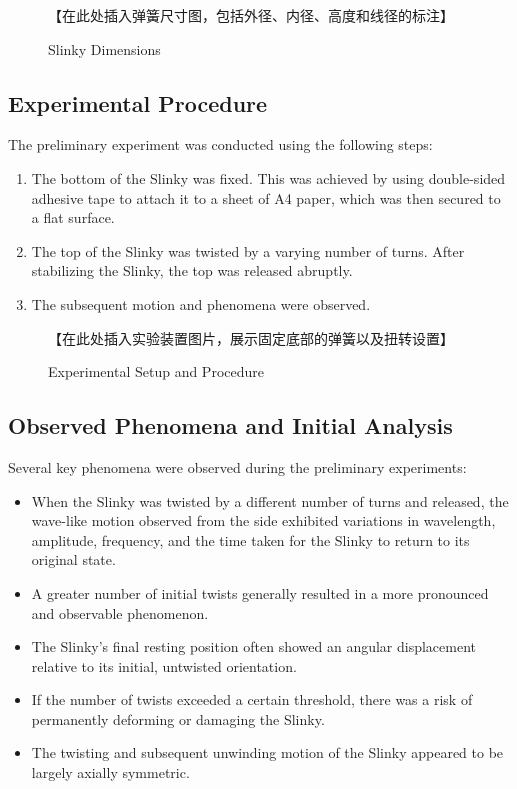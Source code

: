 \documentclass{mcmthesis}  %
\begin{document}
\begin{figure}[h!]
    \centering
    【在此处插入弹簧尺寸图，包括外径、内径、高度和线径的标注】
    \caption{Slinky Dimensions}
    \label{fig:slinky_dimensions}
\end{figure}

\subsection{Experimental Procedure} %
The preliminary experiment was conducted using the following steps:
\begin{enumerate}
    \item The bottom of the Slinky was fixed. This was achieved by using double-sided adhesive tape to attach it to a sheet of A4 paper, which was then secured to a flat surface.
    \item The top of the Slinky was twisted by a varying number of turns. After stabilizing the Slinky, the top was released abruptly.
    \item The subsequent motion and phenomena were observed.
\end{enumerate}

\begin{figure}[h!]
    \centering
    【在此处插入实验装置图片，展示固定底部的弹簧以及扭转设置】
    \caption{Experimental Setup and Procedure}
    \label{fig:exp_setup}
\end{figure}

\subsection{Observed Phenomena and Initial Analysis} %
Several key phenomena were observed during the preliminary experiments:
\begin{itemize}
    \item When the Slinky was twisted by a different number of turns and released, the wave-like motion observed from the side exhibited variations in wavelength, amplitude, frequency, and the time taken for the Slinky to return to its original state.
    \item A greater number of initial twists generally resulted in a more pronounced and observable phenomenon.
    \item The Slinky's final resting position often showed an angular displacement relative to its initial, untwisted orientation.
    \item If the number of twists exceeded a certain threshold, there was a risk of permanently deforming or damaging the Slinky.
    \item The twisting and subsequent unwinding motion of the Slinky appeared to be largely axially symmetric.
\end{itemize}
\end{document}
